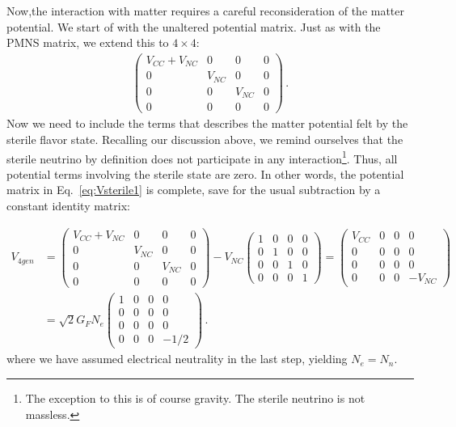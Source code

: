\documentclass{thesis}
\begin{document}
Now,the interaction with matter requires a careful reconsideration of the matter potential. We start of with the unaltered potential matrix. 
Just as with the PMNS matrix, we extend this to $4\times4$:
\begin{align}\label{eq:Vsterile1}
    \begin{pmatrix}
        V_{CC} + V_{NC} & 0 & 0 & 0 \\
        0 &V_{NC} & 0 & 0 \\
        0 & 0 & V_{NC} & 0 \\
        0 & 0 & 0 & 0 
    \end{pmatrix}\,.
\end{align}
Now we need to include the terms that describes the matter potential felt by the sterile flavor state. Recalling our discussion above, we remind ourselves that the sterile neutrino by definition
does not participate in any interaction\footnote{The exception to this is of course gravity. The sterile neutrino is not massless.}. Thus, all potential terms involving the sterile state are zero. 
In other words, the potential matrix in Eq.~\ref{eq:Vsterile1} is complete, save for the usual subtraction by a constant identity matrix:

\begin{align}\label{eq:Vsterile}
    V_{4gen} &=
    \begin{pmatrix}
        V_{CC} + V_{NC} & 0 & 0 & 0 \\
        0 &V_{NC} & 0 & 0 \\
        0 & 0 & V_{NC} & 0 \\
        0 & 0 & 0 & 0 
    \end{pmatrix} - V_{NC}\begin{pmatrix}
        1 & 0 & 0 & 0 \\
        0 &1 & 0 & 0 \\
        0 & 0 & 1 & 0 \\
        0 & 0 & 0 & 1 
    \end{pmatrix}
    = \begin{pmatrix}
        V_{CC} & 0 & 0 & 0 \\
        0 &0 & 0 & 0 \\
        0 & 0 & 0 & 0 \\
        0 & 0 & 0 & -V_{NC}
    \end{pmatrix} \nonumber \\
    &=\sqrt{2}G_F N_e\begin{pmatrix}
        1 & 0 & 0 & 0 \\
        0 &0 & 0 & 0 \\
        0 & 0 & 0 & 0 \\
        0 & 0 & 0 & -1/2
    \end{pmatrix}\,.
\end{align}
where we have assumed electrical neutrality in the last step, yielding $N_e = N_n$.
\end{document}
